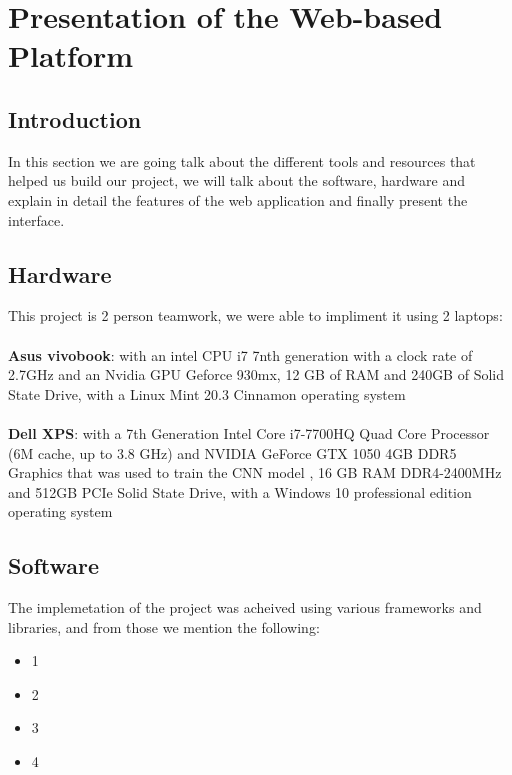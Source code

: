 \section{Presentation of the Web-based Platform}



\subsection{Introduction}
    In this section we are going talk about the different tools and resources that helped us build our project, we will talk about the software, hardware and explain in detail the features of the web application and finally present the interface.


\subsection{Hardware}
    This project is 2 person teamwork, we were able to impliment it using 2 laptops: \\
    \bigskip \\
    \textbf{Asus vivobook}: with an intel CPU i7 7nth generation with a clock rate of 2.7GHz and an Nvidia GPU Geforce 930mx, 12 GB of RAM and 240GB of Solid State Drive, with a Linux Mint 20.3 Cinnamon operating system\\ 
    \bigskip \\
    \textbf{Dell XPS}: with a 7th Generation Intel Core i7-7700HQ Quad Core Processor (6M cache, up to 3.8 GHz) and NVIDIA GeForce GTX 1050 4GB DDR5 Graphics that was used to train the CNN model , 16 GB RAM DDR4-2400MHz and 512GB PCIe Solid State Drive, with a Windows 10 professional edition operating system \\ 


\subsection{Software}
    The implemetation of the project was acheived using various frameworks and libraries, and from those we mention the following: \\
    \begin{itemize}
        \item 1
        \item 2
        \item 3
        \item 4
    \end{itemize}

